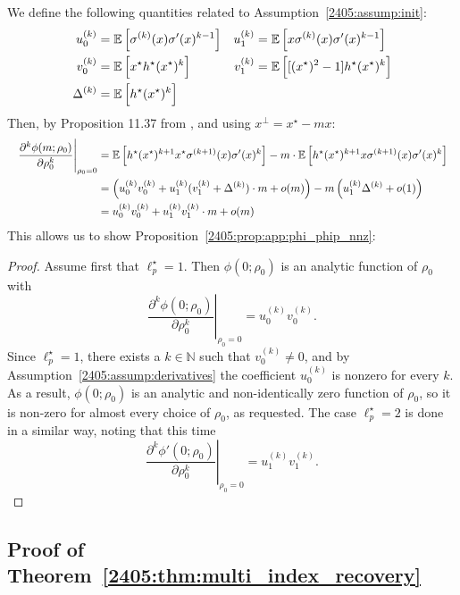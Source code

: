 We define the following quantities related to Assumption~\ref{2405:assump:init}:
\begin{align*}
  u_{0}^{(k)} &= \mathbb{E}\left[\sigma^{(k)}(x) \sigma'(x)^{k-1}\right]  &u_{1}^{(k)} &= \mathbb{E}\left[x \sigma^{(k)}(x) \sigma'(x)^{k-1}\right] \\
  v_{0}^{(k)} &= \mathbb{E}\left[x^\star h^\star(x^\star)^k\right] & v_{1}^{(k)} &= \mathbb{E}\left[[(x^\star)^2-1] h^\star(x^\star)^k\right] \\
  \Delta^{(k)} &= \mathbb{E}\left[h^\star(x^\star)^k\right]
\end{align*}
Then, by Proposition 11.37 from \cite{odonnell2014analysis}, and using $x^\bot = x^\star - mx$:
\[
  \resizebox{\linewidth}{!}{$\displaystyle
    \begin{aligned}
      \left.\frac{\partial^k \phi(m; \rho_0)}{\partial \rho_0^k}\right|_{\rho_0 = 0} &= \Ea{h^\star(x^\star)^{k+1} x^\star \sigma^{(k+1)}(x) \sigma'(x)^k} - m \cdot \Ea{h^\star(x^\star)^{k+1} x \sigma^{(k+1)}(x) \sigma'(x)^k} \\
      &= \left(u_{0}^{(k)}v_{0}^{(k)} + u_{1}^{(k)}(v_{1}^{(k)} + \Delta^{(k)})\cdot m + o(m)\right) - m \left(u_1^{(k)} \Delta^{(k)} + o(1)\right) \\
      &= u_{0}^{(k)}v_{0}^{(k)} + u_{1}^{(k)}v_{1}^{(k)}\cdot m + o(m)
    \end{aligned}
  $}
\]
This allows us to show Proposition~\ref{2405:prop:app:phi_phip_nnz}:
\begin{proof}
  Assume first that $\ell_p^\star = 1$. Then $\phi(0; \rho_0)$ is an analytic function of $\rho_0$ with
  \[ \left.\frac{\partial^k \phi(0; \rho_0)}{\partial \rho_0^k}\right|_{\rho_0 = 0} = u_{0}^{(k)}v_{0}^{(k)}. \]
  Since $\ell_p^\star = 1$, there exists a $k \in \mathbb{N}$ such that $v_{0}^{(k)} \neq 0$, and by Assumption~\ref{2405:assump:derivatives} the coefficient $u_{0}^{(k)}$ is nonzero for every $k$. As a result, $\phi(0;\rho_0)$ is an analytic and non-identically zero function of $\rho_0$, so it is non-zero for almost every choice of $\rho_0$, as requested. The case $\ell_p^\star = 2$ is done in a similar way, noting that this time
  \[ \left.\frac{\partial^k \phi'(0; \rho_0)}{\partial \rho_0^k}\right|_{\rho_0 = 0} = u_{1}^{(k)}v_{1}^{(k)}. \]
\end{proof}

\subsection{Proof of Theorem~\ref{2405:thm:multi_index_recovery}}

